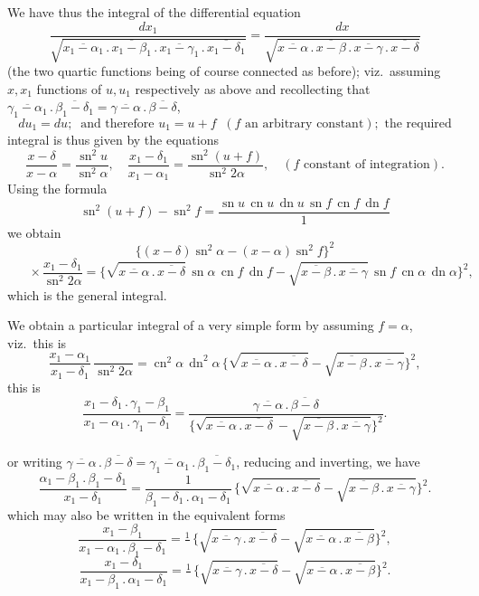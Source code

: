 \documentclass[11pt,a4paper]{article}
\providecommand{\sn}{\operatorname{sn}}
\providecommand{\cn}{\operatorname{cn}}
\providecommand{\dn}{\operatorname{dn}}
\begin{document}
We have thus the integral of the differential equation
\[
\frac{dx_{1}}{\sqrt{\overline{x_{1} - \alpha_{1}}\,.\,\overline{x_{1} - \beta_{1}}\,.\,\overline{x_{1} - \gamma_{1}}\,.\,\overline{x_{1} - \delta_{1}}}} = \frac{dx}{\sqrt{\overline{x - \alpha}\,.\,\overline{x - \beta}\,.\,\overline{x - \gamma}\,.\,\overline{x - \delta}}}
\]
(the two quartic functions being of course connected as before); viz.\ assuming $x, x_{1}$ functions of $u, u_{1}$ respectively as above and recollecting that $\overline{\gamma_{1} - \alpha_{1}}\,.\,\overline{\beta_{1} - \delta_{1}} = \overline{\gamma - \alpha}\,.\,\overline{\beta - \delta}$,
\[
du_{1} = du; \;\; \text{and therefore } u_{1} = u + f \;\; (f \text{ an arbitrary constant}); \text{ the required}
\]
integral is thus given by the equations
\[
\frac{x - \delta}{x - \alpha} = \frac{\sn^{2} u}{\sn^{2}\alpha}, \quad \frac{x_{1} - \delta_{1}}{x_{1} - \alpha_{1}} = \frac{\sn^{2}(u + f)}{\sn^{2} 2\alpha}, \quad (f \text{ constant of integration}).
\]
Using the formula
\[
\sn^{2}(u + f) - \sn^{2} f = \frac{\sn u\,\cn u\,\dn u\,\sn f\,\cn f\,\dn f}{1}
\]
we obtain
\[
\{(x - \delta)\sn^{2}\alpha - (x - \alpha)\sn^{2} f\}^{2}
\]
\[
\;\;\;\;\;\; \times \frac{x_{1} - \delta_{1}}{\sn^{2} 2\alpha} = \{\sqrt{\overline{x - \alpha}\,.\,\overline{x - \delta}}\,\sn\alpha\,\cn f\,\dn f - \sqrt{\overline{x - \beta}\,.\,\overline{x - \gamma}}\,\sn f\,\cn\alpha\,\dn\alpha\}^{2},
\]
which is the general integral.

We obtain a particular integral of a very simple form by assuming $f = \alpha$, viz.\ this is
\[
\frac{x_{1} - \alpha_{1}}{x_{1} - \delta_{1}}\,\frac{}{\sn^{2} 2\alpha} = \cn^{2}\alpha\,\dn^{2}\alpha\,\{\sqrt{\overline{x - \alpha}\,.\,\overline{x - \delta}} - \sqrt{\overline{x - \beta}\,.\,\overline{x - \gamma}}\}^{2},
\]
this is
\[
\frac{x_{1} - \delta_{1}\,.\,\gamma_{1} - \beta_{1}}{x_{1} - \alpha_{1}\,.\,\gamma_{1} - \delta_{1}} = \frac{\overline{\gamma - \alpha}\,.\,\overline{\beta - \delta}}{\{\sqrt{\overline{x - \alpha}\,.\,\overline{x - \delta}} - \sqrt{\overline{x - \beta}\,.\,\overline{x - \gamma}}\}^{2}}.
\]

\newpage


or writing $\overline{\gamma - \alpha}\,.\,\overline{\beta - \delta} = \overline{\gamma_{1} - \alpha_{1}}\,.\,\overline{\beta_{1} - \delta_{1}}$, reducing and inverting, we have
\[
\frac{\alpha_{1} - \beta_{1}\,.\,\beta_{1} - \delta_{1}}{x_{1} - \delta_{1}} = \frac{1}{\beta_{1} - \delta_{1}\,.\,\alpha_{1} - \delta_{1}}\,\{\sqrt{\overline{x - \alpha}\,.\,\overline{x - \delta}} - \sqrt{\overline{x - \beta}\,.\,\overline{x - \gamma}}\}^{2}.
\]
which may also be written in the equivalent forms
\[
\frac{x_{1} - \beta_{1}}{x_{1} - \alpha_{1}\,.\,\beta_{1} - \delta_{1}} = \tfrac{1}{}\,\{\sqrt{\overline{x - \gamma}\,.\,\overline{x - \delta}} - \sqrt{\overline{x - \alpha}\,.\,\overline{x - \beta}}\}^{2},
\]
\[
\frac{x_{1} - \delta_{1}}{x_{1} - \beta_{1}\,.\,\alpha_{1} - \delta_{1}} = \tfrac{1}{}\,\{\sqrt{\overline{x - \gamma}\,.\,\overline{x - \delta}} - \sqrt{\overline{x - \alpha}\,.\,\overline{x - \beta}}\}^{2}.
\]
\end{document}
